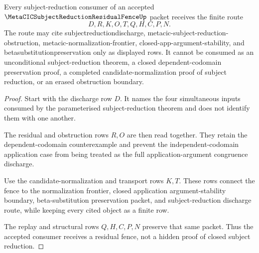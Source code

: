 \begin{theorem}
\label{thm:metacic-subject-reduction-residual-fence-nonescape}
Every subject-reduction consumer of an accepted $\MetaCICSubjectReductionResidualFenceUp$ packet receives the finite route
$$
D,R,K,O,T,Q,H,C,P,N .
$$
The route may cite subjectreductiondischarge, metacic-subject-reduction-obstruction, metacic-normalization-frontier, closed-app-argument-stability, and betasubstitutionpreservation only as displayed rows. It cannot be consumed as an unconditional subject-reduction theorem, a closed dependent-codomain preservation proof, a completed candidate-normalization proof of subject reduction, or an erased obstruction boundary.
\end{theorem}
\begin{proof}
Start with the discharge row $D$. It names the four simultaneous inputs consumed by the parameterised subject-reduction theorem and does not identify them with one another.

The residual and obstruction rows $R,O$ are then read together. They retain the dependent-codomain counterexample and prevent the independent-codomain application case from being treated as the full application-argument congruence discharge.

Use the candidate-normalization and transport rows $K,T$. These rows connect the fence to the normalization frontier, closed application argument-stability boundary, beta-substitution preservation packet, and subject-reduction discharge route, while keeping every cited object as a finite row.

The replay and structural rows $Q,H,C,P,N$ preserve that same packet. Thus the accepted consumer receives a residual fence, not a hidden proof of closed subject reduction.
\end{proof}

